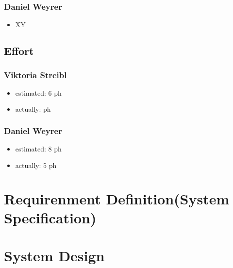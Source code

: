 \subsubsection{Daniel Weyrer}
\begin{itemize}
	\item XY
	
\end{itemize}

\subsection{Effort}

\subsubsection {Viktoria Streibl}
\begin{itemize}
	\item estimated: 6 ph 
	\item actually:  ph
\end{itemize}

\subsubsection {Daniel Weyrer}
\begin{itemize}
	\item estimated: 8 ph 
	\item actually: 5 ph
\end{itemize}

\section{Requirenment Definition(System Specification)}


\section{System Design}
